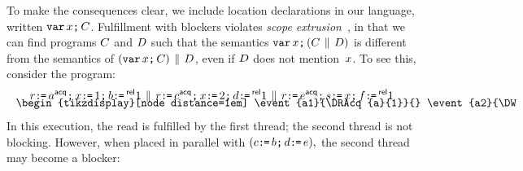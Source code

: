 To make the consequences clear, we include location declarations in our
language, written $\texttt{var}\,x\texttt{;}\, C$.  Fulfillment with blockers violates
\emph{scope extrusion}~\cite{Milner:1999:CMS:329902}, in that we can find
programs $C$ and $D$ such that the semantics
${\texttt{var}\,x\texttt{;}\,(C\,\mathbin{\|}\,D)}$ is different from the semantics of
${(\texttt{var}\,x\texttt{;}\,C)\,\mathbin{\|}\,D}$, even if $D$ does not mention~$x$.
To see this, consider the program:
\begin{gather*}
  \aReg\GETS a\ACQ\SEMI
  x\GETS1 \SEMI
  b\GETS\REL 1
  \PAR
  \aReg\GETS c\ACQ\SEMI
  x\GETS2 \SEMI
  d\GETS\REL 1
  \PAR
  \aReg\GETS e\ACQ\SEMI
  \bReg\GETS x \SEMI
  f\GETS\REL 1
  \\[-2ex]
  \begin{minipage}{1.0\linewidth}
    \begin{tikzdisplay}[node distance=1em]
      \event{a1}{\DRAcq{a}{1}}{}
      \event{a2}{\DW{x}{1}}{right=of a1}
      \po{a1}{a2}
      \event{a3}{\DWRel{b}{1}}{right=of a2}
      \po{a2}{a3}
      \event{b1}{\DRAcq{c}{1}}{right=3em of a3}
      \event{b2}{\DW{x}{2}}{right=of b1}
      \po{b1}{b2}
      \event{b3}{\DWRel{d}{1}}{right=of b2}
      \po{b2}{b3}
      \event{c1}{\DRAcq{e}{1}}{right=3em of b3}
      \event{c2}{\DR{x}{1}}{right=of c1}
      \po{c1}{c2}
      \event{c3}{\DWRel{f}{1}}{right=of c2}
      \po{c2}{c3}
      \rf[out=10,in=170]{a2}{c2}
    \end{tikzdisplay}
  \end{minipage}
\end{gather*}
In this execution, the read is fulfilled by the first thread; the second
thread is not blocking.  However, when placed in parallel with
\begin{math}
  (c\texttt{:}\mkern-1mu\texttt{=}\, b\texttt{;}\, d\texttt{:}\mkern-1mu\texttt{=}\, e),
\end{math}
the second thread may become a blocker:
\begin{tikzdisplay}[node distance=1em]
\end{tikzdisplay}

